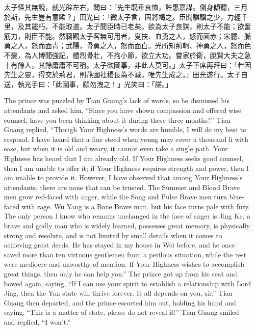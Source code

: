 \documentclass[12pt]{book}
\begin{document}
\Columns
\begin{pairs}
\begin{Rightside}
\begin{chinese}
\beginnumbering
\pstart
太子怪其無說，就光辟左右，問曰：「先生既垂哀恤，許惠嘉謀。側身傾聽，三月於斯，先生豈有意歟？」田光曰：「微太子言，固將竭之。臣聞騏驥之少，力輕千里，及其罷朽，不能取道。太子聞臣時已老矣。欲為太子良謀，則太子不能；欲奮筋力，則臣不能。然竊觀太子客無可用者，夏扶、血勇之人，怒而面赤；宋臆、脈勇之人，怒而面青；武陽，骨勇之人，怒而面白。光所知荊軻、神勇之人，怒而色不變，為人博聞強記，體烈骨壯，不拘小節，欲立大功。嘗家於衛，脫賢大夫之急十有餘人，其餘庸庸不可稱。太子欲圖事，非此人莫可。」太子下席再拜曰：「若因先生之靈，得交於荊君，則燕國社稷長為不滅。唯先生成之。」田光遂行。太子自送，執光手曰：「此國事，願勿洩之！」光笑曰：「諾。」
\pend
\endnumbering
\end{chinese}
\end{Rightside}
\begin{Leftside}
\begin{fioesjfsoeifj}
\beginnumbering
\pstart
The prince was puzzled by Tian Guang's lack of words, so he dismissed his attendants and asked him, ``Since you have shown compassion and offered wise counsel, have you been thinking about it during these three months?'' Tian Guang replied, ``Though Your Highness's words are humble, I will do my best to respond. I have heard that a fine steed when young may cover a thousand li with ease, but when it is old and weary, it cannot even take a single path. Your Highness has heard that I am already old. If Your Highness seeks good counsel, then I am unable to offer it; if Your Highness requires strength and power, then I am unable to provide it. However, I have observed that among Your Highness's attendants, there are none that can be trusted. The Summer and Blood Brave men grow red-faced with anger, while the Song and Pulse Brave men turn blue-faced with rage. Wu Yang is a Bone Brave man, but his face turns pale with fury. The only person I know who remains unchanged in the face of anger is Jing Ke, a brave and godly man who is widely learned, possesses great memory, is physically strong and resolute, and is not limited by small details when it comes to achieving great deeds. He has stayed in my house in Wei before, and he once saved more than ten virtuous gentlemen from a perilous situation, while the rest were mediocre and unworthy of mention. If Your Highness wishes to accomplish great things, then only he can help you.'' The prince got up from his seat and bowed again, saying, ``If I can use your spirit to establish a relationship with Lord Jing, then the Yan state will thrive forever. It all depends on you, sir.'' Tian Guang then departed, and the prince escorted him out, holding his hand and saying, ``This is a matter of state, please do not reveal it!'' Tian Guang smiled and replied, ``I won't.''
\pend
\endnumbering
\end{fioesjfsoeifj}
\end{Leftside}
\end{pairs}
\end{document}
